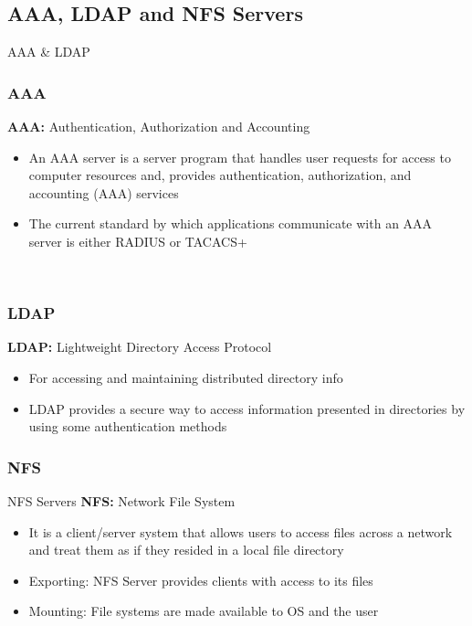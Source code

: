 \documentclass[xcolor=dvipsnames]{beamer}
\begin{document}
\subsection{AAA, LDAP and NFS Servers}
\begin{frame}{AAA \& LDAP }
\subsubsection{AAA}
\textbf{AAA:}
Authentication, Authorization and Accounting
\begin{itemize}
	\item An AAA server is a server program that handles user requests for access to computer resources and, provides authentication, authorization, and accounting (AAA) services
	\item The current standard by which applications communicate with an AAA server is either RADIUS or TACACS+
\end{itemize}
\underline{}\\
\subsubsection{LDAP}
\textbf{LDAP:}
Lightweight Directory Access Protocol
\begin{itemize}
	\item For accessing and maintaining distributed directory info
	\item LDAP provides a secure way to access information presented in directories by using some authentication methods
\end{itemize}
\end{frame}
\subsubsection{NFS}
\begin{frame}{NFS Servers}
\textbf{NFS:}
Network File System
\begin{itemize}
	\item It is a client/server system that allows users to access files across a network and treat them as if they resided in a local file directory
	\item Exporting: NFS Server provides clients with access to its files
	\item Mounting: File systems are made available to OS and the user	
\end{itemize}

\end{frame}
\end{document}
